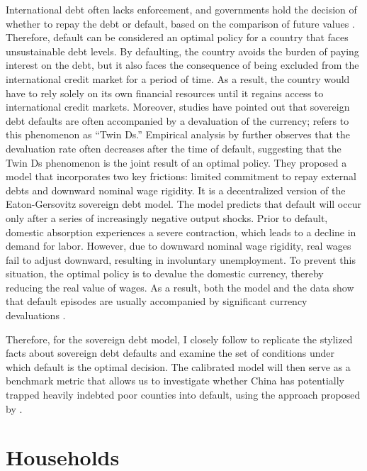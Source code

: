International debt often lacks enforcement, and governments hold the decision of whether to repay the debt or default, based on the comparison of future values \citep*{Eaton-Gersovitz-81}. Therefore, default can be considered an optimal policy for a country that faces unsustainable debt levels. By defaulting, the country avoids the burden of paying interest on the debt, but it also faces the consequence of being excluded from the international credit market for a period of time. As a result, the country would have to rely solely on its own financial resources until it regains access to international credit markets.
Moreover, studies have pointed out that sovereign debt defaults are often accompanied by a devaluation of the currency; \citet*{Reinhart02} refers to this phenomenon as ``Twin Ds.''
Empirical analysis by \citet*{Na-18} further observes that the devaluation rate often decreases after the time of default, suggesting that the Twin Ds phenomenon is the joint result of an optimal policy.
They proposed a model that incorporates two key frictions: limited commitment to repay external debts and downward nominal wage rigidity.
It is a decentralized version of the Eaton-Gersovitz sovereign debt model.
The model predicts that default will occur only after a series of increasingly negative output shocks. Prior to default, domestic absorption experiences a severe contraction, which leads to a decline in demand for labor. However, due to downward nominal wage rigidity, real wages fail to adjust downward, resulting in involuntary unemployment. To prevent this situation, the optimal policy is to devalue the domestic currency, thereby reducing the real value of wages. As a result, both the model and the data show that default episodes are usually accompanied by significant currency devaluations \citep*{Na-18}.

Therefore, for the sovereign debt model, I closely follow \citet*{Na-18} to replicate the stylized facts about sovereign debt defaults and examine the set of conditions under which default is the optimal decision.
The calibrated model will then serve as a benchmark metric that allows us to investigate whether China has potentially trapped heavily indebted poor counties into default, using the approach proposed by \citet*{Hinrichsen_2020-chapter4}.

\section{Households}


